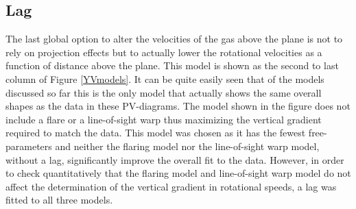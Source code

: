 \documentclass[useAMS,usenatbib]{mn2e}
\begin{document}
\subsection{Lag}\label{Lag}
The last global option to alter the velocities of the gas above the plane is not to rely on projection effects but to actually lower the rotational velocities as a function of distance above the plane.  This model is shown as the second to last column of Figure \ref{YVmodels}. It can be quite easily seen that of the models discussed so far this is the only model that actually shows the same overall shapes as the data in these PV-diagrams.  The model shown in the figure does not include a flare or a line-of-sight warp thus maximizing the vertical gradient required to match the data. This model was chosen as it has the fewest free-parameters and neither the flaring model nor the line-of-sight  warp model, without a lag, significantly improve the overall fit to the data. However, in order to check quantitatively that the flaring model and line-of-sight  warp model do not affect the determination of the vertical gradient in rotational speeds, a lag was fitted to all three models. \\
\end{document}
